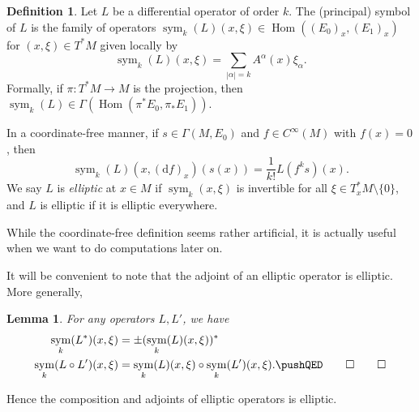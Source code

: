 \documentclass{shortart}
\newtheorem*{lemma}{Lemma}
\theoremstyle{definition}
\newtheorem*{defi}{Definition}
\renewcommand\d{\mathrm{d}}
\DeclareMathOperator\Hom{Hom}
\DeclareMathOperator\symb{sym}
\begin{document}
\begin{defi}
  Let $L$ be a differential operator of order $k$. The (principal) symbol of $L$ is the family of operators $\symb_k(L)(x, \xi)\in \Hom((E_0)_x, (E_1)_x)$ for $(x, \xi) \in T^*M$ given locally by
  \[
    \symb_k (L)(x, \xi) = \sum_{|\alpha| = k} A^\alpha(x) \xi_\alpha.
  \]
  Formally, if $\pi: T^*M \to M$ is the projection, then $\symb_k(L) \in \Gamma(\Hom(\pi^* E_0, \pi_* E_1))$.

  In a coordinate-free manner, if $s \in \Gamma(M, E_0)$ and $f \in C^\infty(M)$ with $f(x) = 0$, then
  \[
    \symb_k (L)(x, (\d f)_x)(s(x)) = \frac{1}{k!} L(f^k s)(x).
  \]
  We say $L$ is \emph{elliptic} at $x \in M$ if $\symb_k(x, \xi)$ is invertible for all $\xi \in T^*_x M \setminus \{0\}$, and $L$ is elliptic if it is elliptic everywhere.
\end{defi}
While the coordinate-free definition seems rather artificial, it is actually useful when we want to do computations later on.

It will be convenient to note that the adjoint of an elliptic operator is elliptic. More generally,
\begin{lemma}
  For any operators $L, L'$, we have
  \begin{align*}
    \symb_k(L^*)(x, \xi) &= \pm (\symb_k(L)(x, \xi))^*\\
    \symb_k(L \circ L')(x, \xi) &= \symb_k(L)(x, \xi) \circ \symb_k(L')(x, \xi).\fakeqed
  \end{align*}\ifplastex\fakeqed\fi
\end{lemma}
Hence the composition and adjoints of elliptic operators is elliptic.
\end{document}
